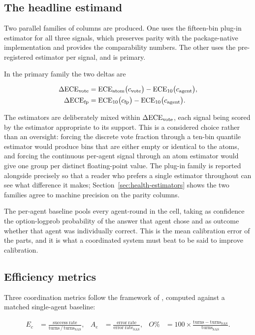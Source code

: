 \subsection{The headline estimand}

Two parallel families of columns are produced. One uses the fifteen-bin plug-in estimator
for all three signals, which preserves parity with the package-native implementation and
provides the comparability numbers. The other uses the pre-registered estimator per
signal, and is primary.

In the primary family the two deltas are

\begin{align}
\Delta\mathrm{ECE}_{\mathrm{vote}} &= \mathrm{ECE}_{\mathrm{atom}}\bigl(c_{\mathrm{vote}}\bigr) - \mathrm{ECE}_{10}\bigl(c_{\mathrm{agent}}\bigr), \\
\Delta\mathrm{ECE}_{\mathrm{fp}} &= \mathrm{ECE}_{10}\bigl(c_{\mathrm{fp}}\bigr) - \mathrm{ECE}_{10}\bigl(c_{\mathrm{agent}}\bigr).
\end{align}

The estimators are deliberately mixed within $\Delta\mathrm{ECE}_{\mathrm{vote}}$, each signal being scored by the
estimator appropriate to its support. This is a considered choice rather than an
oversight: forcing the discrete vote fraction through a ten-bin quantile estimator would
produce bins that are either empty or identical to the atoms, and forcing the continuous
per-agent signal through an atom estimator would give one group per distinct floating-point
value. The plug-in family is reported alongside precisely so that a reader who prefers a
single estimator throughout can see what difference it makes; Section~\ref{sec:health-estimators}
shows the two families agree to machine precision on the parity columns.

The per-agent baseline pools every agent-round in the cell, taking as confidence the
option-logprob probability of the answer that agent chose and as outcome whether that
agent was individually correct. This is the mean calibration error of the parts, and it is
what a coordinated system must beat to be said to improve calibration.

\subsection{Efficiency metrics}
\label{sec:efficiency-defs}

Three coordination metrics follow the framework of \citet{kim2025scaling}, computed
against a matched single-agent baseline:

\begin{align}
E_c &= \frac{\mathrm{success\ rate}}{\mathrm{turns}\,/\,\mathrm{turns}_{\mathrm{SAS}}},
&A_e &= \frac{\mathrm{error\ rate}}{\mathrm{error\ rate}_{\mathrm{SAS}}},
&O\% &= 100 \times \frac{\mathrm{turns} - \mathrm{turns}_{\mathrm{SAS}}}{\mathrm{turns}_{\mathrm{SAS}}}.
\end{align}

